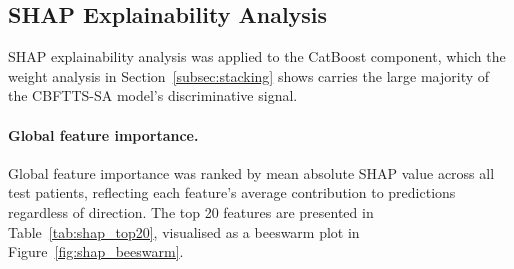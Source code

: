 \documentclass[final,3p,times]{elsarticle}
\begin{document}
\subsection{SHAP Explainability Analysis}
\label{subsec:shap}
 
SHAP explainability analysis was applied to the CatBoost component,
which the weight analysis in Section~\ref{subsec:stacking} shows
carries the large majority of the CBFTTS-SA model's discriminative signal.
 
\paragraph{Global feature importance.}
Global feature importance was ranked by mean absolute SHAP value across
all test patients, reflecting each feature's average contribution to
predictions regardless of direction. The top 20 features are presented
in Table~\ref{tab:shap_top20}, visualised as a beeswarm plot in
Figure~\ref{fig:shap_beeswarm}.
 
\end{document}
